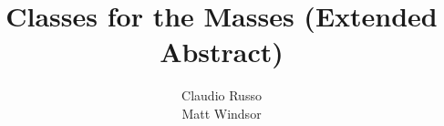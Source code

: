 \documentclass[preprint]{sig-alternate-05-2015}
\begin{document}

%

\title{Classes for the Masses (Extended Abstract)}
%
%
%
%
%

%
\author{
%
%
\alignauthor
Claudio Russo \\
\alignauthor
Matt Windsor \\
}
\end{document}
